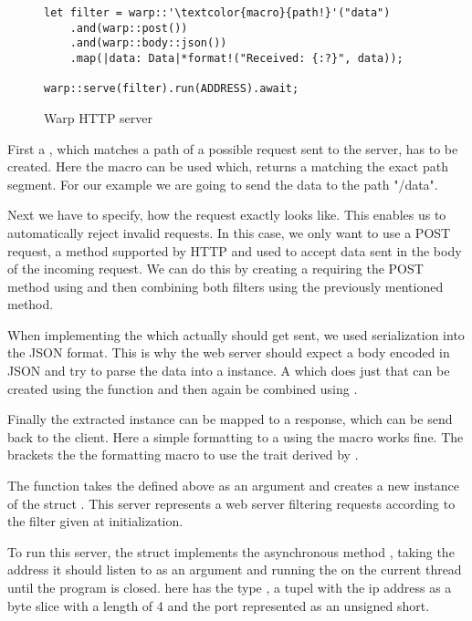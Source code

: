 \begin{figure}[ht]
    \begin{verbatim}
let filter = warp::'\textcolor{macro}{path!}'("data")
    .and(warp::post())
    .and(warp::body::json())
    .map(|data: Data|*format!("Received: {:?}", data));

warp::serve(filter).run(ADDRESS).await;
    \end{verbatim}
    \caption{Warp HTTP server}
\end{figure}

First a , which matches a path of a possible request sent to the server, has to be created. Here the macro
 can be used which, returns a  matching the exact path segment. For our example
we are going to send the data to the path "/data".

Next we have to specify, how the request exactly looks like. This enables us to automatically reject invalid requests.
In this case, we only want to use a POST request, a method supported by HTTP and used to accept data sent in the body
of the incoming request. We can do this by creating a  requiring the POST method using 
and then combining both filters using the previously mentioned  method.

When implementing the  which actually should get sent, we used serialization into the JSON format. This is
why the web server should expect a body encoded in JSON and try to parse the data into a  instance. A
 which does just that can be created using the function  and then again be
combined using .

Finally the extracted  instance can be mapped to a response, which can be send back to the client. Here a
simple formatting to a  using the  macro works fine. The  brackets the the
formatting macro to use the  trait derived by .

The function  takes the  defined above as an argument and creates a new instance of the
struct . This server represents a web server filtering requests according to the filter given at
initialization.

To run this server, the struct implements the asynchronous method , taking the address it should listen to
as an argument and running the  on the current thread until the program is closed.  here has
the type , a tupel with the ip address as a byte slice with a length of 4 and the port represented
as an unsigned short.

